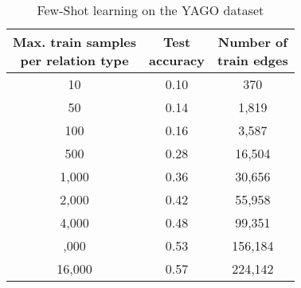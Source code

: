 \begin{table*}[htbp]
\begin{minipage}{.3\linewidth}
    \end{minipage}%
    \begin{minipage}{.3\linewidth}
    \centering
    \begin{tabular}{||c|c|c||}
        \hline
        \makecell{Max. train samples\\per relation type} & \makecell{Test\\accuracy} & \makecell{Number of\\train edges}\\
        \hline\hline
        10 & 0.10 & 370\\
        50 & 0.14 & 1,819\\
        100 & 0.16 & 3,587\\
        500 & 0.28 & 16,504\\
        1,000 & 0.36 & 30,656\\
        2,000 & 0.42 & 55,958\\
        4,000 & 0.48 & 99,351\\
        \hdashline
        8,000 & 0.53 & 156,184\\
        16,000 & 0.57 & 224,142\\
        \hline
        \end{tabular}
        \caption{Few-Shot learning on the YAGO dataset}
        \label{tab:YAGO_fewshot}
    \end{minipage}%
\end{table*}
    